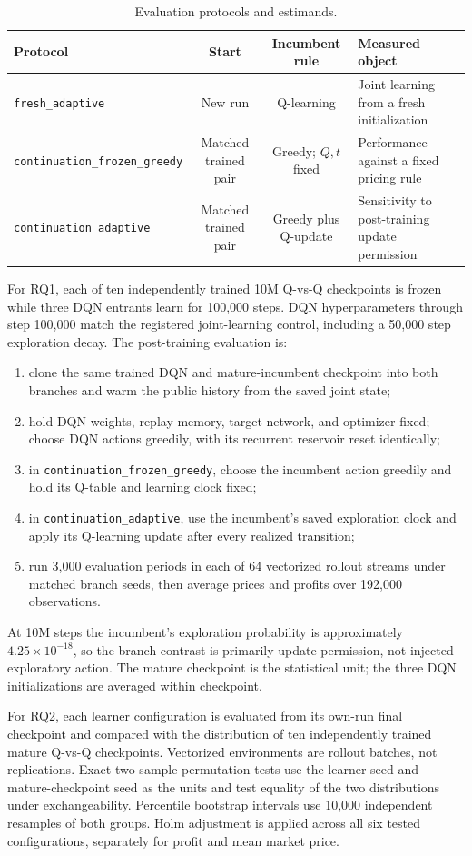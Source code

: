 \documentclass[11pt]{article}
\newcommand{\fresh}{\texttt{fresh\_adaptive}}
\newcommand{\frozen}{\texttt{continuation\_frozen\_greedy}}
\newcommand{\adaptive}{\texttt{continuation\_adaptive}}
\begin{document}
\begin{table}[H]
\centering
\caption{Evaluation protocols and estimands.}
\label{tab:protocols}
\small
\begin{tabularx}{\textwidth}{lccY}
\toprule
Protocol & Start & Incumbent rule & Measured object \\
\midrule
\fresh & New run & Q-learning & Joint learning from a fresh initialization \\
\frozen & Matched trained pair & Greedy; \(Q,t\) fixed & Performance against a fixed pricing rule \\
\adaptive & Matched trained pair & Greedy plus Q-update & Sensitivity to post-training update permission \\
\bottomrule
\end{tabularx}
\end{table}

For RQ1, each of ten independently trained 10M Q-vs-Q checkpoints is frozen
while three DQN entrants learn for 100,000 steps. DQN hyperparameters through
step 100,000 match the registered joint-learning control, including a 50,000
step exploration decay. The post-training evaluation is:
\begin{enumerate}
\item clone the same trained DQN and mature-incumbent checkpoint into both
branches and warm the public history from the saved joint state;
\item hold DQN weights, replay memory, target network, and optimizer fixed;
choose DQN actions greedily, with its recurrent reservoir reset identically;
\item in \frozen{}, choose the incumbent action greedily and hold its Q-table
and learning clock fixed;
\item in \adaptive{}, use the incumbent's saved exploration clock and apply
its Q-learning update after every realized transition;
\item run 3,000 evaluation periods in each of 64 vectorized rollout streams
under matched branch seeds, then average prices and profits over 192,000
observations.
\end{enumerate}
At 10M steps the incumbent's exploration probability is approximately
\(4.25\times10^{-18}\), so the branch contrast is primarily update permission,
not injected exploratory action. The mature checkpoint is the statistical
unit; the three DQN initializations are averaged within checkpoint.

For RQ2, each learner configuration is evaluated from its own-run final checkpoint and
compared with the distribution of ten independently trained mature Q-vs-Q
checkpoints. Vectorized environments are rollout batches, not replications.
Exact two-sample permutation tests use the learner seed and mature-checkpoint
seed as the units and test equality of the two distributions under
exchangeability. Percentile bootstrap intervals use 10,000 independent
resamples of both groups. Holm adjustment is applied across all six tested
configurations, separately for profit and mean market price.
\end{document}
